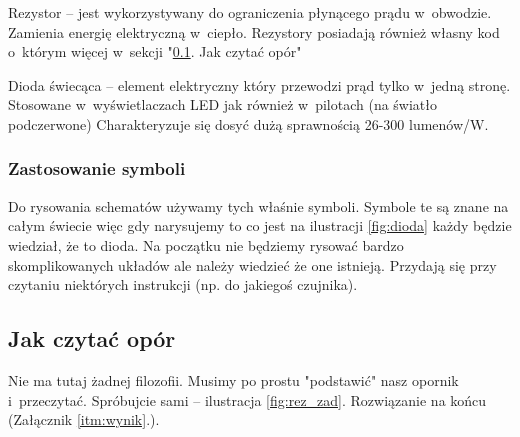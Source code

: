 \documentclass[a4paper,12pt, twoside]{article}
\begin{document}
Rezystor -- jest wykorzystywany do ograniczenia płynącego prądu w~obwodzie. Zamienia energię elektryczną w~ciepło. Rezystory posiadają również własny kod o~którym więcej w~sekcji "\ref{subsec:kod}. Jak czytać opór" %

Dioda świecąca -- element elektryczny który przewodzi prąd tylko w~jedną stronę. Stosowane w~wyświetlaczach LED jak również w~pilotach (na światło podczerwone) Charakteryzuje się dosyć dużą sprawnością 26-300 lumenów/W. 

\subsubsection{Zastosowanie symboli}
    
Do rysowania schematów używamy tych właśnie symboli. Symbole te są znane na całym świecie więc gdy narysujemy to co jest na ilustracji \ref{fig:dioda} każdy będzie wiedział, że to dioda. Na początku nie będziemy rysować bardzo skomplikowanych układów ale należy wiedzieć że one istnieją. Przydają się przy czytaniu niektórych instrukcji (np. do jakiegoś czujnika).

	\subsection{Jak czytać opór}
	\label{subsec:kod}
Nie ma tutaj żadnej filozofii. Musimy po prostu "podstawić" nasz opornik i~przeczytać. Spróbujcie sami -- ilustracja \ref{fig:rez_zad}. Rozwiązanie na końcu (Załącznik \ref{itm:wynik}.).
\end{document}
